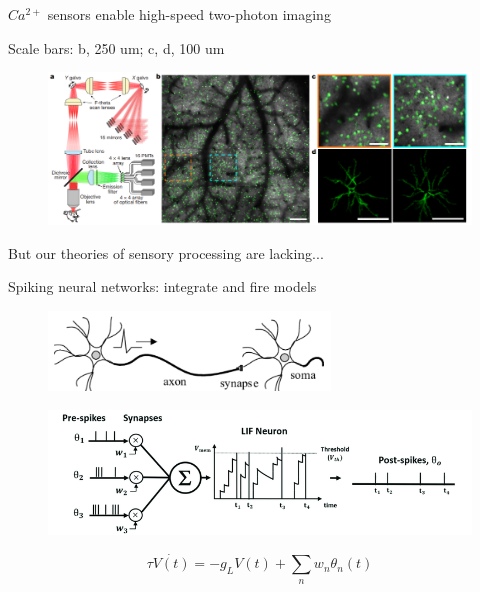 \documentclass[aspectratio=169]{beamer}
\begin{document}
\begin{frame}{$Ca^{2+}$ sensors enable high-speed two-photon imaging}

Scale bars: b, 250 um; c, d, 100 um
\begin{figure}
\centering
\includegraphics[width=140mm]{figure-16}
\end{figure}

But our theories of sensory processing are lacking...

\end{frame}

\begin{frame}{Spiking neural networks: integrate and fire models}


\begin{figure}
\centering
\includegraphics[width=75mm]{figure-15}
\end{figure}

\begin{figure}
\centering
\includegraphics[width=125mm]{figure-14}
\end{figure}

\begin{equation*}
\tau\dot{V(t)} = -g_{L}V(t) + \sum_{n} w_{n}\theta_{n}(t)
\end{equation*}

\end{frame}
\end{document}
